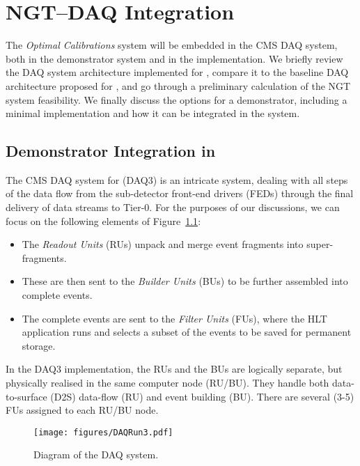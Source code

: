 \chapter{NGT--DAQ Integration} \label{sec:NGT-DAQintegration}

The \emph{Optimal Calibrations} system will be embedded in the CMS DAQ system,
both in the demonstrator system and in the \Phasetwo implementation. We briefly review the DAQ system architecture implemented for \Runthree, compare it to the baseline DAQ architecture proposed for \Phasetwo, and go through a preliminary calculation of the NGT system feasibility. We finally discuss the options for a demonstrator, including a minimal implementation and how it can be integrated in the \Runthree system.

\section{Demonstrator Integration in \Runthree}
The CMS DAQ system for \Runthree (DAQ3) is an intricate system, dealing with all steps of the data flow from the sub-detector front-end drivers (FEDs) through the final delivery of data streams to Tier-0. For the purposes of our discussions, we can focus on the following elements of Figure~\ref{fig:DAQ3}: 
\begin{itemize}
    \item The \emph{Readout Units} (RUs) unpack and merge event fragments into super-fragments.
    \item These are then sent to the \emph{Builder Units} (BUs) to be further assembled into complete events.
    \item The complete events are sent to the \emph{Filter Units} (FUs), where the HLT application runs and selects a subset of the events to be saved for permanent storage. 
\end{itemize}

In the DAQ3 implementation, the RUs and the BUs are logically separate, but physically realised in the same computer node (RU/BU). They handle both data-to-surface (D2S) data-flow (RU) and event building (BU). There are several (3-5) FUs assigned to each RU/BU node.

\begin{figure}[htbp]
   \centering
	\texttt{[image: figures/DAQRun3.pdf]}
  \caption{Diagram of the \Runthree DAQ system.}
   \label{fig:DAQ3}
\end{figure}

